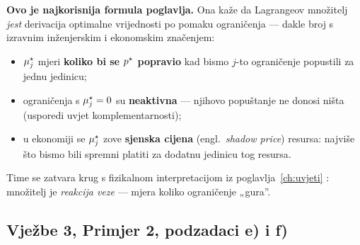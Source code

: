 \textbf{Ovo je najkorisnija formula poglavlja.} Ona kaže da Lagrangeov
množitelj \emph{jest} derivacija optimalne vrijednosti po pomaku ograničenja
--- dakle broj s izravnim inženjerskim i ekonomskim značenjem:

\begin{itemize}
  \item $\mu_j^{\star}$ mjeri \textbf{koliko bi se $p^{\star}$ popravio} kad bismo
        $j$-to ograničenje popustili za jednu jedinicu;
  \item ograničenja s $\mu_j^{\star} = 0$ su \textbf{neaktivna} --- njihovo
        popuštanje ne donosi ništa (usporedi uvjet komplementarnosti);
  \item u ekonomiji se $\mu_j^{\star}$ zove \textbf{sjenska cijena} (engl.\
        \emph{shadow price}) resursa: najviše što bismo bili spremni platiti za
        dodatnu jedinicu tog resursa.
\end{itemize}

Time se zatvara krug s fizikalnom interpretacijom iz
poglavlja~\ref{ch:uvjeti} : množitelj je \emph{reakcija veze} ---
mjera koliko ograničenje „gura”.

\subsection{Vježbe 3, Primjer 2, podzadaci e) i f)}

